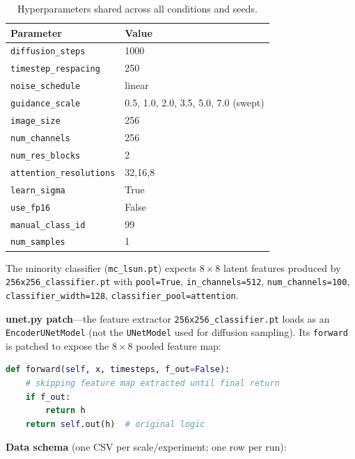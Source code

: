 \documentclass[10pt]{article}
\begin{document}
\begin{table}[h]
\centering
\caption{Hyperparameters shared across all conditions and seeds.}
\renewcommand{\arraystretch}{1.1}
\begin{tabular}{@{}ll@{}}
\toprule
\textbf{Parameter} & \textbf{Value} \\
\midrule
\texttt{diffusion\_steps}       & 1000 \\
\texttt{timestep\_respacing}    & 250 \\
\texttt{noise\_schedule}        & linear \\
\texttt{guidance\_scale}        & 0.5, 1.0, 2.0, 3.5, 5.0, 7.0 (swept) \\
\texttt{image\_size}            & 256 \\
\texttt{num\_channels}          & 256 \\
\texttt{num\_res\_blocks}        & 2 \\
\texttt{attention\_resolutions} & 32,16,8 \\
\texttt{learn\_sigma}           & True \\
\texttt{use\_fp16}              & False \\
\texttt{manual\_class\_id}      & 99 \\
\texttt{num\_samples}           & 1 \\
\bottomrule
\end{tabular}
\end{table}

The minority classifier (\texttt{mc\_lsun.pt}) expects $8{\times}8$ latent features produced
by \texttt{256x256\_classifier.pt} with \texttt{pool=True}, \texttt{in\_channels=512},
\texttt{num\_channels=100}, \texttt{classifier\_width=128},
\texttt{classifier\_pool=attention}.

\textbf{unet.py patch}---the feature extractor
\texttt{256x256\_classifier.pt} loads as an \texttt{EncoderUNetModel}
(not the \texttt{UNetModel} used for diffusion sampling).  Its
\texttt{forward} is patched to expose the $8{\times}8$ pooled feature map:

\begin{lstlisting}[language=Python,caption={unet.py patch: expose intermediate pooled features during sampling.}]
def forward(self, x, timesteps, f_out=False):
    # skipping feature map extracted until final return
    if f_out:
        return h
    return self.out(h)  # original logic
\end{lstlisting}

\medskip
\noindent\textbf{Data schema} (one CSV per scale/experiment; one row per run):
\end{document}
